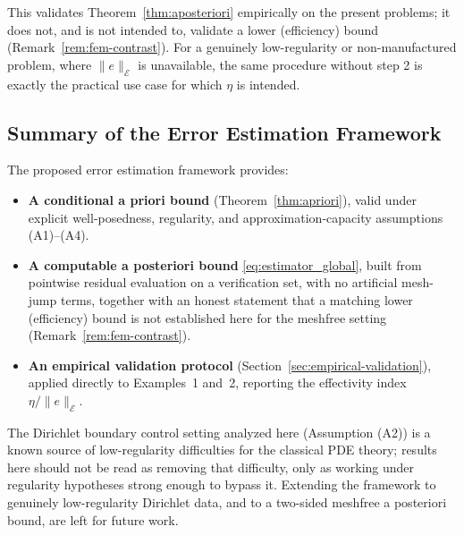 This validates Theorem~\ref{thm:aposteriori} empirically on the present problems; it does not, and is not intended to, validate a lower (efficiency) bound (Remark~\ref{rem:fem-contrast}). For a genuinely low-regularity or non-manufactured problem, where $\|e\|_{\mathcal{E}}$ is unavailable, the same procedure without step 2 is exactly the practical use case for which $\eta$ is intended.

\subsection{Summary of the Error Estimation Framework}
\label{sec:error-summary}

The proposed error estimation framework provides:
\begin{itemize}
    \item \textbf{A conditional a priori bound} (Theorem~\ref{thm:apriori}), valid under explicit well-posedness, regularity, and approximation-capacity assumptions (A1)--(A4).
    \item \textbf{A computable a posteriori bound} \eqref{eq:estimator_global}, built from pointwise residual evaluation on a verification set, with no artificial mesh-jump terms, together with an honest statement that a matching lower (efficiency) bound is not established here for the meshfree setting (Remark~\ref{rem:fem-contrast}).
    \item \textbf{An empirical validation protocol} (Section~\ref{sec:empirical-validation}), applied directly to Examples~1 and~2, reporting the effectivity index $\eta/\|e\|_{\mathcal{E}}$.
\end{itemize}

\begin{remark}
The Dirichlet boundary control setting analyzed here (Assumption (A2)) is a known source of low-regularity difficulties for the classical PDE theory; results here should not be read as removing that difficulty, only as working under regularity hypotheses strong enough to bypass it. Extending the framework to genuinely low-regularity Dirichlet data, and to a two-sided meshfree a posteriori bound, are left for future work.
\end{remark}